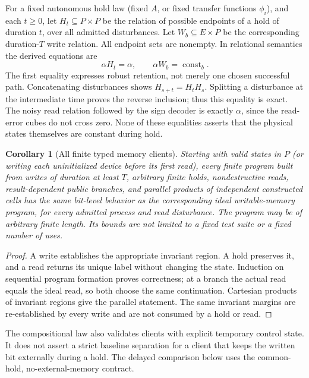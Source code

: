 \documentclass[11pt]{article}
\newtheorem{corollary}[theorem]{Corollary}
\theoremstyle{definition}
\theoremstyle{remark}
\begin{document}
For a fixed autonomous hold law (fixed $A$, or fixed transfer functions
$\phi_i$), and each $t\geq0$, let $H_t\subseteq P\times P$ be the relation of possible endpoints of a hold of duration $t$, over all admitted disturbances. Let $W_b\subseteq E\times P$ be the corresponding duration-$T$ write relation. All endpoint sets are nonempty. In relational semantics the derived equations are
\[
 \alpha H_t=\alpha,\qquad
 \alpha W_b=\operatorname{const}_b.
\]
The first equality expresses robust retention, not merely one chosen successful path. Concatenating disturbances shows $H_{s+t}=H_tH_s$. Splitting a disturbance at the intermediate time proves the reverse inclusion; thus this equality is exact. The noisy read relation followed by the sign decoder is exactly $\alpha$, since the read-error cubes do not cross zero. None of these equalities asserts that the physical states themselves are constant during hold.

\begin{corollary}[All finite typed memory clients]\label{fb:cor:reuse}
Starting with valid states in $P$ (or writing each uninitialized device before its first read), every finite program built from writes of duration at least $T$, arbitrary finite holds, nondestructive reads, result-dependent public branches, and parallel products of independent constructed cells has the same bit-level behavior as the corresponding ideal writable-memory program, for every admitted process and read disturbance. The program may be of arbitrary finite length. Its bounds are not limited to a fixed test suite or a fixed number of uses.
\end{corollary}
\begin{proof}
A write establishes the appropriate invariant region. A hold preserves it, and a read returns its unique label without changing the state. Induction on sequential program formation proves correctness; at a branch the actual read equals the ideal read, so both choose the same continuation. Cartesian products of invariant regions give the parallel statement. The same invariant margins are re-established by every write and are not consumed by a hold or read.
\end{proof}

The compositional law also validates clients with explicit temporary
control state. It does not assert a strict baseline separation for a
client that keeps the written bit externally during a hold. The delayed
comparison below uses the common-hold, no-external-memory contract.
\end{document}
